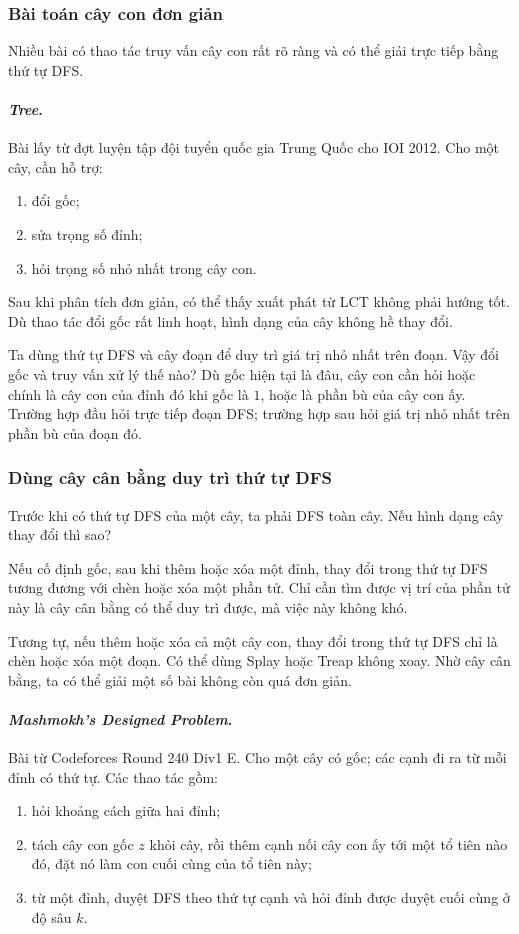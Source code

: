 \documentclass[11pt]{article}
\begin{document}
\subsubsection{Bài toán cây con đơn giản}

Nhiều bài có thao tác truy vấn cây con rất rõ ràng và có thể giải trực tiếp bằng
thứ tự DFS.

\paragraph{\emph{Tree}.}
Bài lấy từ đợt luyện tập đội tuyển quốc gia Trung Quốc cho IOI 2012. Cho một
cây, cần hỗ trợ:
\begin{enumerate}
  \item đổi gốc;
  \item sửa trọng số đỉnh;
  \item hỏi trọng số nhỏ nhất trong cây con.
\end{enumerate}

Sau khi phân tích đơn giản, có thể thấy xuất phát từ LCT không phải hướng tốt.
Dù thao tác đổi gốc rất linh hoạt, hình dạng của cây không hề thay đổi.

Ta dùng thứ tự DFS và cây đoạn để duy trì giá trị nhỏ nhất trên đoạn. Vậy đổi gốc
và truy vấn xử lý thế nào? Dù gốc hiện tại là đâu, cây con cần hỏi hoặc chính là
cây con của đỉnh đó khi gốc là \(1\), hoặc là phần bù của cây con ấy. Trường hợp
đầu hỏi trực tiếp đoạn DFS; trường hợp sau hỏi giá trị nhỏ nhất trên phần bù của
đoạn đó.

\subsubsection{Dùng cây cân bằng duy trì thứ tự DFS}

Trước khi có thứ tự DFS của một cây, ta phải DFS toàn cây. Nếu hình dạng cây thay
đổi thì sao?

Nếu cố định gốc, sau khi thêm hoặc xóa một đỉnh, thay đổi trong thứ tự DFS tương
đương với chèn hoặc xóa một phần tử. Chỉ cần tìm được vị trí của phần tử này là
cây cân bằng có thể duy trì được, mà việc này không khó.

Tương tự, nếu thêm hoặc xóa cả một cây con, thay đổi trong thứ tự DFS chỉ là chèn
hoặc xóa một đoạn. Có thể dùng Splay hoặc Treap không xoay. Nhờ cây cân bằng, ta
có thể giải một số bài không còn quá đơn giản.

\paragraph{\emph{Mashmokh's Designed Problem}.}
Bài từ Codeforces Round 240 Div1 E. Cho một cây có gốc; các cạnh đi ra từ mỗi
đỉnh có thứ tự. Các thao tác gồm:
\begin{enumerate}
  \item hỏi khoảng cách giữa hai đỉnh;
  \item tách cây con gốc \(z\) khỏi cây, rồi thêm cạnh nối cây con ấy tới một tổ
  tiên nào đó, đặt nó làm con cuối cùng của tổ tiên này;
  \item từ một đỉnh, duyệt DFS theo thứ tự cạnh và hỏi đỉnh được duyệt cuối cùng
  ở độ sâu \(k\).
\end{enumerate}
\end{document}
